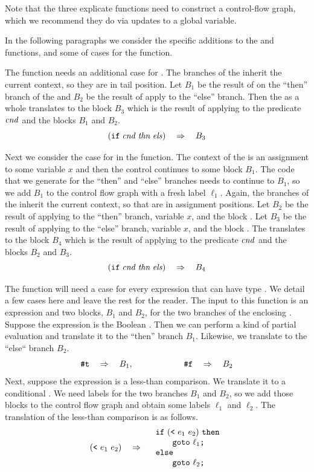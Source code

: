 \documentclass[11pt]{book}
\begin{document}
Note that the three explicate functions need to construct a
control-flow graph, which we recommend they do via updates to a global
variable.

In the following paragraphs we consider the specific additions to the
 and  functions, and some
of cases for the  function.

The  function needs an additional case for
. The branches of the  inherit the current context, so
they are in tail position.  Let $B_1$ be the result of
 on the ``then'' branch of the  and $B_2$
be the result of apply  to the ``else''
branch. Then the  as a whole translates to the block $B_3$
which is the result of applying  to the predicate
$\mathit{cnd}$ and the blocks $B_1$ and $B_2$.
\[
    (\texttt{if}\; \mathit{cnd}\; \mathit{thn}\; \mathit{els}) \quad\Rightarrow\quad B_3
\]

Next we consider the case for  in the 
function. The context of the  is an assignment to some
variable $x$ and then the control continues to some block $B_1$.  The
code that we generate for the ``then'' and ``else'' branches needs to
continue to $B_1$, so we add $B_1$ to the control flow graph with a
fresh label $\ell_1$.  Again, the branches of the  inherit the
current context, so that are in assignment positions.  Let $B_2$ be
the result of applying  to the ``then'' branch,
variable $x$, and the block .  Let $B_3$ be the result
of applying  to the ``else'' branch, variable
$x$, and the block . The  translates to the
block $B_4$ which is the result of applying  to
the predicate $\mathit{cnd}$ and the blocks $B_2$ and $B_3$.
\[
(\texttt{if}\; \mathit{cnd}\; \mathit{thn}\; \mathit{els}) \quad\Rightarrow\quad B_4
\]

The function  will need a case for every
expression that can have type . We detail a few cases
here and leave the rest for the reader. The input to this function is
an expression and two blocks, $B_1$ and $B_2$, for the two branches of
the enclosing . Suppose the expression is the Boolean
.  Then we can perform a kind of partial evaluation and
translate it to the ``then'' branch $B_1$. Likewise, we translate
 to the ``else`` branch $B_2$.
\[
\texttt{\#t} \quad\Rightarrow\quad B_1,
\qquad\qquad\qquad
\texttt{\#f} \quad\Rightarrow\quad B_2
\]
Next, suppose the expression is a less-than comparison. We translate
it to a conditional . We need labels for the two branches
$B_1$ and $B_2$, so we add those blocks to the control flow graph and
obtain some labels $\ell_1$ and $\ell_2$. The translation of the
less-than comparison is as follows.
\[
(\texttt{<}~e_1~e_2) \quad\Rightarrow\quad
\begin{array}{l}
\texttt{if}~(\texttt{<}~e_1~e_2)~\texttt{then} \\
\qquad\texttt{goto}~\ell_1\texttt{;}\\
\texttt{else}\\
\qquad\texttt{goto}~\ell_2\texttt{;}
\end{array}
\]
\end{document}
